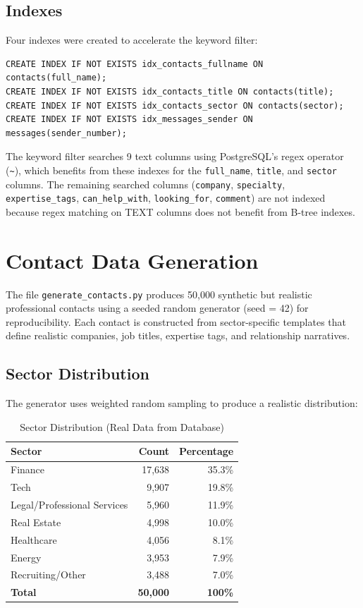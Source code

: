 \documentclass[12pt, a4paper]{report}
\begin{document}
\subsection{Indexes}

Four indexes were created to accelerate the keyword filter:

\begin{lstlisting}[style=sqlstyle]
CREATE INDEX IF NOT EXISTS idx_contacts_fullname ON contacts(full_name);
CREATE INDEX IF NOT EXISTS idx_contacts_title ON contacts(title);
CREATE INDEX IF NOT EXISTS idx_contacts_sector ON contacts(sector);
CREATE INDEX IF NOT EXISTS idx_messages_sender ON messages(sender_number);
\end{lstlisting}

The keyword filter searches 9 text columns using PostgreSQL's regex operator (\texttt{\textasciitilde}), which benefits from these indexes for the \texttt{full\_name}, \texttt{title}, and \texttt{sector} columns. The remaining searched columns (\texttt{company}, \texttt{specialty}, \texttt{expertise\_tags}, \texttt{can\_help\_with}, \texttt{looking\_for}, \texttt{comment}) are not indexed because regex matching on TEXT columns does not benefit from B-tree indexes.

\section{Contact Data Generation}

The file \texttt{generate\_contacts.py} produces 50,000 synthetic but realistic professional contacts using a seeded random generator (seed = 42) for reproducibility. Each contact is constructed from sector-specific templates that define realistic companies, job titles, expertise tags, and relationship narratives.

\subsection{Sector Distribution}

The generator uses weighted random sampling to produce a realistic distribution:

\begin{table}[H]
\centering
\begin{tabular}{lrr}
\toprule
\textbf{Sector} & \textbf{Count} & \textbf{Percentage} \\
\midrule
Finance & 17,638 & 35.3\% \\
Tech & 9,907 & 19.8\% \\
Legal/Professional Services & 5,960 & 11.9\% \\
Real Estate & 4,998 & 10.0\% \\
Healthcare & 4,056 & 8.1\% \\
Energy & 3,953 & 7.9\% \\
Recruiting/Other & 3,488 & 7.0\% \\
\midrule
\textbf{Total} & \textbf{50,000} & \textbf{100\%} \\
\bottomrule
\end{tabular}
\caption{Sector Distribution (Real Data from Database)}
\end{table}
\end{document}
